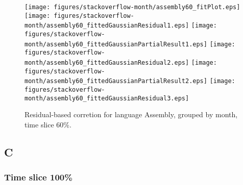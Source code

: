 \begin{figure}[hb]
\centering
{}
{\texttt{[image: figures/stackoverflow-month/assembly60\_fitPlot.eps]}}
{\texttt{[image: figures/stackoverflow-month/assembly60\_fittedGaussianResidual1.eps]}}
{\texttt{[image: figures/stackoverflow-month/assembly60\_fittedGaussianPartialResult1.eps]}}
{\texttt{[image: figures/stackoverflow-month/assembly60\_fittedGaussianResidual2.eps]}}
{\texttt{[image: figures/stackoverflow-month/assembly60\_fittedGaussianPartialResult2.eps]}}
{\texttt{[image: figures/stackoverflow-month/assembly60\_fittedGaussianResidual3.eps]}}
\caption{Residual-based corretion for language Assembly, grouped by month, time slice 60\%.}
\end{figure}


\clearpage 
\newpage 


\subsection{C}

\FloatBarrier

\subsubsection{Time slice 100\%}


